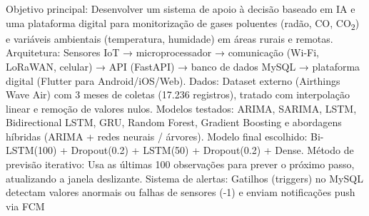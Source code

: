 \documentclass[12pt,a4paper]{article}
\begin{document}
                                      {Objetivo principal: Desenvolver um sistema de apoio à decisão baseado em IA e uma plataforma digital para monitorização de gases poluentes 
                                      (radão, CO, CO\textsubscript{2}) e variáveis ambientais (temperatura, humidade) em áreas rurais e remotas.
                                       Arquitetura: Sensores IoT → microprocessador → comunicação (Wi-Fi, LoRaWAN, celular) → API (FastAPI) → banco de dados MySQL → plataforma digital (Flutter para Android/iOS/Web).
                                       Dados: Dataset externo (Airthings Wave Air) com 3 meses de coletas (17.236 registros), tratado com interpolação linear e remoção de valores nulos.
                                       Modelos testados: ARIMA, SARIMA, LSTM, Bidirectional LSTM, GRU, Random Forest, Gradient Boosting e abordagens híbridas (ARIMA + redes neurais / árvores).
                                       Modelo final escolhido: Bi-LSTM(100) + Dropout(0.2) + LSTM(50) + Dropout(0.2) + Dense.
                                       Método de previsão iterativo: Usa as últimas 100 observações para prever o próximo passo, atualizando a janela deslizante.
                                       Sistema de alertas: Gatilhos (triggers) no MySQL detectam valores anormais ou falhas de sensores (-1) e enviam notificações push via FCM}
\end{document}
